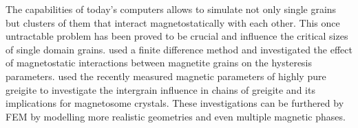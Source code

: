 The capabilities of today's computers allows to simulate not only single grains but clusters of them that interact magnetostatically with each other. This once untractable problem has been proved to be crucial and influence the critical sizes of single domain grains. \citet{Mxwt2} used a finite difference method and investigated the effect of magnetostatic interactions between magnetite grains on the hysteresis parameters. \citet{Mxwt1} used the recently measured \citep{Chang} magnetic parameters of highly pure greigite to investigate the intergrain influence in chains of greigite and its implications for magnetosome crystals. These investigations can be furthered by FEM by modelling more realistic geometries and even multiple magnetic phases.\par